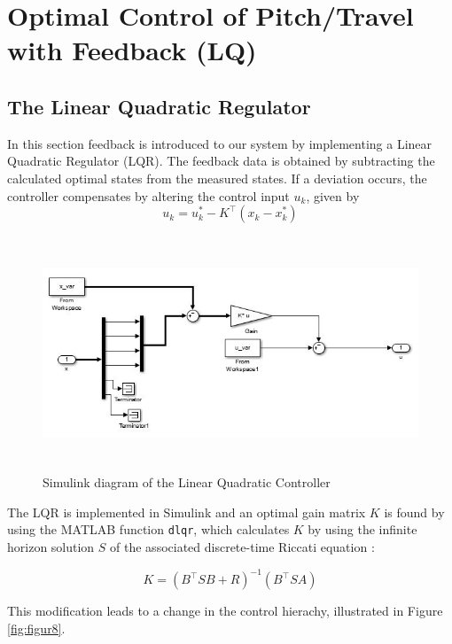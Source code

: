 \section{Optimal Control of Pitch/Travel with Feedback (LQ)}\label{sec:10.3}
\subsection{The Linear Quadratic Regulator} \label{subsec:lqr}
In this section feedback is introduced to our system by implementing a Linear Quadratic Regulator (LQR). The feedback data is obtained by subtracting the calculated optimal states from the measured states. If a deviation occurs, the controller compensates by altering the control input $u_{k}$, given by
\begin{equation}\label{eq:feedBackGain}
u_{k} = u_{k}^*-K^\top(x_{k}-x_{k}^*)
\end{equation}

\begin{figure}[H]
\includegraphics[width=1\linewidth, height=7cm]{figures/LQR_model} 
\centering
\caption{Simulink diagram of the Linear Quadratic Controller}\label{fig:figur7}
\end{figure}

The LQR is implemented in Simulink and an optimal gain matrix $K$ is found by using the MATLAB function \texttt{dlqr}, which calculates $K$ by using the infinite horizon solution $S$ of the associated discrete-time Riccati equation \cite{MathWorks}:

\begin{equation}\label{eq:gainMatrix}
K = (B^\top SB+R)^{-1}(B^\top SA)
\end{equation}

This modification leads to a change in the control hierachy, illustrated in Figure \ref{fig:figur8}.

